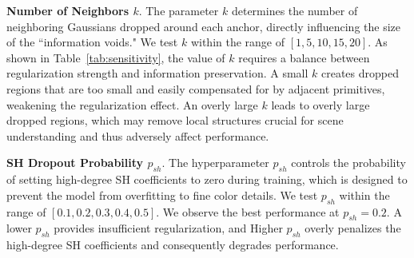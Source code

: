 \vspace{1mm}
\noindent\textbf{Number of Neighbors $k$}. The parameter $k$ determines the number of neighboring Gaussians dropped around each anchor, directly influencing the size of the ``information voids." We test $k$ within the range of $[1, 5, 10, 15, 20]$.
% 
As shown in Table~\ref{tab:sensitivity}, the value of $k$ requires a balance between regularization strength and information preservation. A small $k$ creates dropped regions that are too small and easily compensated for by adjacent primitives, weakening the regularization effect. An overly large $k$ leads to overly large dropped regions, which may remove local structures crucial for scene understanding and thus adversely affect performance.

\vspace{1mm}
\noindent\textbf{SH Dropout Probability $p_{sh}$}. The hyperparameter $p_{sh}$ controls the probability of setting high-degree SH coefficients to zero during training, which is designed to prevent the model from overfitting to fine color details. We test $p_{sh}$ within the range of $[0.1, 0.2, 0.3, 0.4, 0.5]$.
%
We observe the best performance at $p_{sh}=0.2$. A lower $p_{sh}$ provides insufficient regularization, and Higher $p_{sh}$ overly penalizes the high-degree SH coefficients and consequently degrades performance.

\fi




